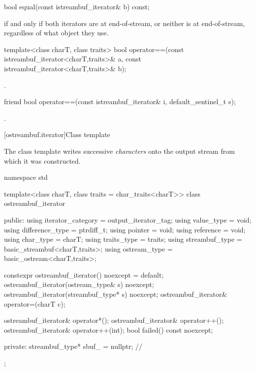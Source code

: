 %
\begin{itemdecl}
bool equal(const istreambuf_iterator& b) const;
\end{itemdecl}

\begin{itemdescr}
\pnum
\returns
{}
if and only if both iterators are at end-of-stream,
or neither is at end-of-stream, regardless of what
object they use.
\end{itemdescr}

%
\begin{itemdecl}
template<class charT, class traits>
  bool operator==(const istreambuf_iterator<charT,traits>& a,
                  const istreambuf_iterator<charT,traits>& b);
\end{itemdecl}

\begin{itemdescr}
\pnum
\returns
{}.
\end{itemdescr}

%
\begin{itemdecl}
friend bool operator==(const istreambuf_iterator& i, default_sentinel_t s);
\end{itemdecl}

\begin{itemdescr}
\pnum
\returns
{}.
\end{itemdescr}

[ostreambuf.iterator]{Class template }

\pnum
The class template 
writes successive \textit{characters} onto the output stream
from which it was constructed.

%
\begin{codeblock}
namespace std {
  template<class charT, class traits = char_traits<charT>>
  class ostreambuf_iterator {
  public:
    using iterator_category = output_iterator_tag;
    using value_type        = void;
    using difference_type   = ptrdiff_t;
    using pointer           = void;
    using reference         = void;
    using char_type         = charT;
    using traits_type       = traits;
    using streambuf_type    = basic_streambuf<charT,traits>;
    using ostream_type      = basic_ostream<charT,traits>;

    constexpr ostreambuf_iterator() noexcept = default;
    ostreambuf_iterator(ostream_type& s) noexcept;
    ostreambuf_iterator(streambuf_type* s) noexcept;
    ostreambuf_iterator& operator=(charT c);

    ostreambuf_iterator& operator*();
    ostreambuf_iterator& operator++();
    ostreambuf_iterator& operator++(int);
    bool failed() const noexcept;

  private:
    streambuf_type* sbuf_ = nullptr;    // \expos
  };
}
\end{codeblock}

